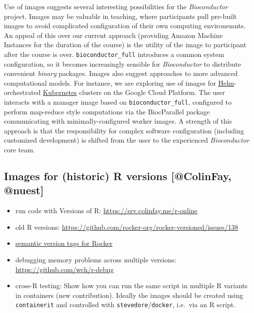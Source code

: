 Use of images suggests several interesting possibilities for the
\emph{Bioconductor} project. Images may be valuable in teaching, where
participants pull pre-built images to avoid complicated configuration of
their own computing environemnts. An appeal of this over our current
approach (providing Amazon Machine Instances for the duration of the
course) is the utility of the image to participant after the course is
over. \texttt{bioconductor\_full} introduces a common system
configuration, so it becomes increasingly sensible for
\emph{Bioconductor} to distribute convenient \emph{binary} packages.
Images also suggest approaches to more advanced computational models.
For instance, we are exploring use of images for
\href{https://helm.sh/}{Helm}-orchestrated
\href{https://kubernetes.io/}{Kubernetes} clusters on the Google Cloud
Platform. The user interacts with a manager image based on
\texttt{bioconductor\_full}, configured to perform map-reduce style
computations via the BiocParallel package communicating with
minimally-configured worker images. A strength of this approach is that
the responsibility for complex software configuration (including
customized development) is shifted from the user to the experienced
\emph{Bioconductor} core team.

\hypertarget{images-for-historic-r-versions-nuestcolinfay-nuest}{%
\subsection{\texorpdfstring{Images for (historic) R versions
{[}@ColinFay,
@nuest{]}}{Images for (historic) R versions , @nuest{[}@ColinFay, @nuest{]}}}\label{images-for-historic-r-versions-nuestcolinfay-nuest}}

\begin{itemize}
\tightlist
\item
  run code with Versions of R: \url{https://srv.colinfay.me/r-online}
\item
  old R versions:
  \url{https://github.com/rocker-org/rocker-versioned/issues/138}
\item
  \href{https://github.com/rocker-org/rocker-versioned/\#version-tags}{semantic
  version tags for Rocker}
\item
  debugging memory problems across multiple versions:
  \url{https://github.com/wch/r-debug}
\item
  cross-R testing: Show how you can run the same script in multiple R
  variants in containers (new contribution). Ideally the images should
  be created using \texttt{containerit} and controlled with
  \texttt{stevedore}/\texttt{docker}, i.e.~via an R script.
\end{itemize}


